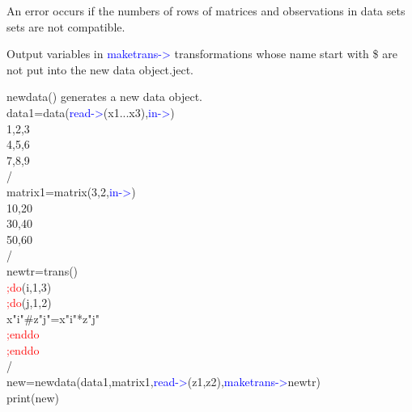 \begin{note}
An error occurs if the numbers of rows of matrices and observations in data sets sets
 are not compatible.
\end{note}
\begin{note}
Output variables in \textcolor{blue}{maketrans->} transformations whose name start with \$ are not put into the new data object.ject.
\end{note}
\begin{example}[newdataex]newdata() generates a new data object.\\
\label{newdataex}
data1=\textcolor{VioletRed}{data}(\textcolor{blue}{read->}(x1...x3),\textcolor{blue}{in->})\\
1,2,3\\
4,5,6\\
7,8,9\\
/\\
matrix1=\textcolor{VioletRed}{matrix}(3,2,\textcolor{blue}{in->})\\
10,20\\
30,40\\
50,60\\
/\\
 newtr=\textcolor{VioletRed}{trans}()\\
 \textcolor{Red}{;do}(i,1,3)\\
 \textcolor{Red}{;do}(j,1,2)\\
 x"i"\#z"j"=x"i"*z"j"\\
 \textcolor{Red}{;enddo}\\
 \textcolor{Red}{;enddo}\\
 /\\
new=\textcolor{VioletRed}{newdata}(data1,matrix1,\textcolor{blue}{read->}(z1,z2),\textcolor{blue}{maketrans->}newtr)\\
\textcolor{VioletRed}{print}(new)
\end{example}
